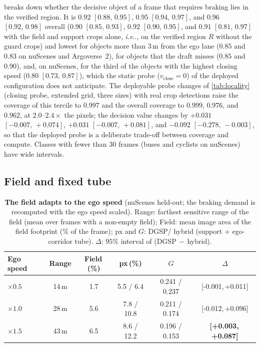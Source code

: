\documentclass[10pt,letterpaper]{article}
\makeatletter
\DeclareRobustCommand\onedot{\futurelet\@let@token\@onedot}
\def\@onedot{\ifx\@let@token.\else.\null\fi\xspace}
\def\ie{\emph{i.e}\onedot} \def\Ie{\emph{I.e}\onedot}
\newcommand{\method}{DGSP\xspace}
\newcommand{\G}{G}
\newcommand{\vclose}{v_{\mathrm{close}}}
\newcommand{\ci}[2]{[#1,\allowbreak\,#2]}
\newcommand{\best}[1]{\textbf{#1}}
\theoremstyle{remark}
\theoremstyle{plain}
\theoremstyle{definition}
\makeatother
\begin{document}
 breaks down whether the decisive object of a frame that requires braking lies in the verified region.
It is $0.92$ $\ci{0.88}{0.95}$, $0.95$ $\ci{0.94}{0.97}$, and $0.96$ $\ci{0.92}{0.98}$ overall ($0.90$ $\ci{0.85}{0.93}$, $0.92$ $\ci{0.90}{0.95}$, and $0.91$ $\ci{0.81}{0.97}$ with the field and support crops alone, \ie, on the verified region $R$ without the guard crops) and lowest for objects more than $3$\,m from the ego lane ($0.85$ and $0.83$ on nuScenes and Argoverse~2), for objects that the draft misses ($0.85$ and $0.90$), and, on nuScenes, for the third of the objects with the highest closing speed ($0.80$ $\ci{0.73}{0.87}$), which the static probe ($\vclose=0$) of the deployed configuration does not anticipate.
The deployable probe changes of \cref{tab:locality} (closing probe, extended grid, three sizes) with real crop detections raise the coverage of this tercile to $0.997$ and the overall coverage to $0.999$, $0.976$, and $0.962$, at $2.0$--$2.4\times$ the pixels; the decision value changes by $+0.031$ $\ci{-0.007}{+0.074}$, $+0.031$ $\ci{-0.007}{+0.081}$, and $-0.092$ $\ci{-0.278}{-0.003}$, so that the deployed probe is a deliberate trade-off between coverage and compute.
Classes with fewer than $30$ frames (buses and cyclists on nuScenes) have wide intervals.

\subsection{Field and fixed tube}
\label{sec:supp_tube}

\begin{table}[!htbp]
\centering
\caption{\textbf{The field adapts to the ego speed} (nuScenes held-out; the braking demand is recomputed with the ego speed scaled). Range: farthest sensitive range of the field (mean over frames with a non-empty field); Field: mean image area of the field footprint (\% of the frame); px and $\G$: \method / hybrid (support + ego-corridor tube). $\Delta$: $95\%$ interval of (\method$\,-\,$hybrid).}
\label{tab:speed}
\small
\setlength{\tabcolsep}{2.6pt}
\begin{tabular}{@{}lccccc@{}}
\toprule
Ego speed & Range & Field\,(\%) & px\,(\%) & $\G$ & $\Delta$ \\
\midrule
$\times0.5$ & 14\,m & 1.7 & 5.5 / 6.4 & 0.241 / 0.237 & \ci{-0.001}{+0.011} \\
$\times1.0$ & 28\,m & 5.6 & 7.8 / 10.8 & 0.211 / 0.174 & \ci{-0.012}{+0.096} \\
$\times1.5$ & 43\,m & 6.5 & 8.6 / 12.2 & 0.196 / 0.153 & \best{\ci{+0.003}{+0.087}} \\
\bottomrule
\end{tabular}
\end{table}
\end{document}
